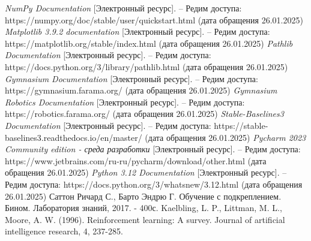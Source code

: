 \begin{thebibliography}{}
	\textit{NumPy Documentation} [Электронный ресурс]. -- 
	Редим доступа: https://numpy.org/doc/stable/user/quickstart.html (дата обращения 26.01.2025)
	\textit{Matplotlib 3.9.2 documentation} [Электронный ресурс]. -- 
	Редим доступа: https://matplotlib.org/stable/index.html (дата обращения 26.01.2025)
	\textit{Pathlib Documentation} [Электронный ресурс]. -- 
	Редим доступа: https://docs.python.org/3/library/pathlib.html (дата обращения 26.01.2025)
	\textit{Gymnasium Documentation} [Электронный ресурс]. --
	Редим доступа: https://gymnasium.farama.org/ (дата обращения 26.01.2025)
	\textit{Gymnasium Robotics Documentation} [Электронный ресурс]. --
	Редим доступа: https://robotics.farama.org/ (дата обращения 26.01.2025)
	\textit{Stable-Baselines3 Documentation} [Электронный ресурс]. --
	Редим доступа: https://stable-baselines3.readthedocs.io/en/master/ (дата обращения 26.01.2025)
	\textit{Pycharm 2023 Community edition - среда разработки} [Электронный ресурс]. -- 
	Редим доступа: https://www.jetbrains.com/ru-ru/pycharm/download/other.html (дата обращения 26.01.2025)
	\textit{Python 3.12 Documentation} [Электронный ресурс]. -- 
	Редим доступа: https://docs.python.org/3/whatsnew/3.12.html (дата обращения 26.01.2025)
	Саттон Ричард С., Барто Эндрю Г. Обучение с подкреплением. Бином. Лаборатория знаний, 2017. - 400с.
	Kaelbling, L. P., Littman, M. L., Moore, A. W. (1996). Reinforcement learning: A survey. Journal of artificial intelligence research, 4, 237-285.

\end{thebibliography}